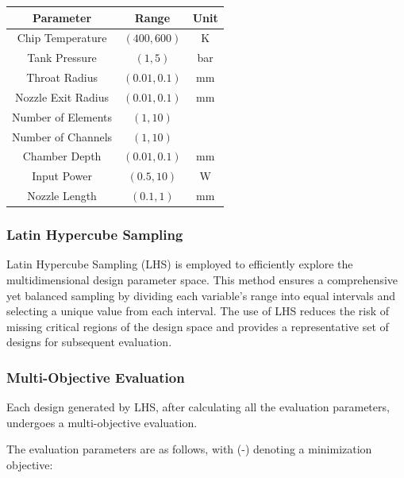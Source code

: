 \documentclass{homework}
\begin{document}
\begin{multicols}{2}
   \begin{minipage}{\linewidth} %
    	    \centering
    	    \label{tab:input_ranges}
    	    \begin{tabular}{|c|c|c|}
    	        \hline
    	        \textbf{Parameter} & \textbf{Range} & \textbf{Unit} \\
    	        \hline
    	        Chip Temperature & $(400, 600)$ & K \\
    	        Tank Pressure & $(1, 5)$ & bar \\
    	        Throat Radius & $(0.01, 0.1)$ & mm \\
    	        Nozzle Exit Radius & $(0.01, 0.1)$ & mm \\
    	        Number of Elements & $(1, 10)$ & \\
    	        Number of Channels & $(1, 10)$ & \\
    	        Chamber Depth & $(0.01, 0.1)$ & mm \\
    	        Input Power & $(0.5, 10)$ & W \\
    	        Nozzle Length & $(0.1, 1)$ & mm \\
    	        \hline
    	    \end{tabular}
         \label{tab:inputranges}
        \end{minipage}  
	    
  
\subsubsection{Latin Hypercube Sampling}
	  Latin Hypercube Sampling (LHS) is employed to efficiently explore the multidimensional design parameter space. This method ensures a comprehensive yet balanced sampling by dividing each variable's range into equal intervals and selecting a unique value from each interval. The use of LHS reduces the risk of missing critical regions of the design space and provides a representative set of designs for subsequent evaluation.
\subsubsection{Multi-Objective Evaluation}
	  Each design generated by LHS, after calculating all the evaluation parameters, undergoes a multi-objective evaluation.

    The evaluation parameters are as follows, with (-) denoting a minimization objective:  
	    

\end{multicols}
\end{document}
